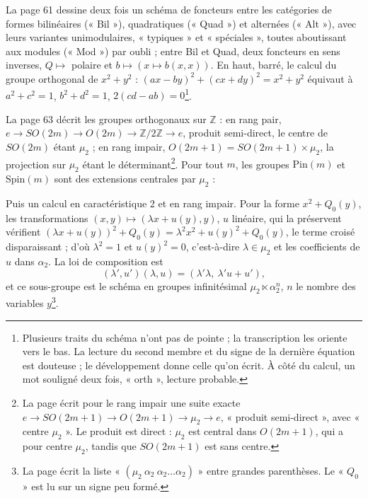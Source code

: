 \documentclass[11pt,a4paper]{article}
\begin{document}
La page 61 dessine deux fois un schéma de foncteurs entre les catégories de
formes bilinéaires (« Bil »), quadratiques (« Quad ») et alternées (« Alt »),
avec leurs variantes unimodulaires, « typiques » et « spéciales », toutes
aboutissant aux modules (« Mod ») par oubli ; entre Bil et Quad, deux foncteurs
en sens inverses, $Q \mapsto$ polaire et $b \mapsto (x \mapsto b(x,x))$. En haut,
barré, le calcul du groupe orthogonal de $x^2 + y^2$ : $(ax - by)^2 + (cx + dy)^2
= x^2 + y^2$ équivaut à $a^2 + c^2 = 1$, $b^2 + d^2 = 1$,
$2(cd - ab) = 0$\footnote{Plusieurs traits du schéma n'ont pas de pointe ; la
transcription les oriente vers le bas. La lecture du second membre et du signe
de la dernière équation est douteuse ; le développement donne celle qu'on
écrit. À côté du calcul, un mot souligné deux fois, « orth », lecture
probable.}.

La page 63 décrit les groupes orthogonaux sur $\mathbb{Z}$ : en rang pair,
$e \to SO(2m) \to O(2m) \to \mathbb{Z}/2\mathbb{Z} \to e$, produit semi-direct, le
centre de $SO(2m)$ étant $\mu_2$ ; en rang impair, $O(2m+1) = SO(2m+1) \times \mu_2$,
la projection sur $\mu_2$ étant le déterminant\footnote{La page écrit pour le rang
impair une suite exacte $e \to SO(2m+1) \to O(2m+1) \to \mu_2 \to e$, « produit
semi-direct », avec « centre $\mu_2$ ». Le produit est direct : $\mu_2$ est central
dans $O(2m+1)$, qui a pour centre $\mu_2$, tandis que $SO(2m+1)$ est sans centre.}.
Pour tout $m$, les groupes $\mathrm{Pin}(m)$ et $\mathrm{Spin}(m)$ sont des
extensions centrales par $\mu_2$ :


Puis un calcul en caractéristique 2 et en rang impair. Pour la forme
$x^2 + Q_0(y)$, les transformations $(x,y) \mapsto (\lambda x + u(y), y)$, $u$
linéaire, qui la préservent vérifient $(\lambda x + u(y))^2 + Q_0(y) = \lambda^2 x^2
+ u(y)^2 + Q_0(y)$, le terme croisé disparaissant ; d'où $\lambda^2 = 1$ et
$u(y)^2 = 0$, c'est-à-dire $\lambda \in \mu_2$ et les coefficients de $u$ dans
$\alpha_2$. La loi de composition est
\[
(\lambda', u')(\lambda, u) = (\lambda'\lambda,\ \lambda' u + u'),
\]
et ce sous-groupe est le schéma en groupes infinitésimal $\mu_2 \ltimes \alpha_2^n$,
$n$ le nombre des variables $y$\footnote{La page écrit la liste
« $(\mu_2\ \alpha_2\ \alpha_2 \ldots \alpha_2)$ » entre grandes parenthèses. Le
« $Q_0$ » est lu sur un signe peu formé.}.
\end{document}

